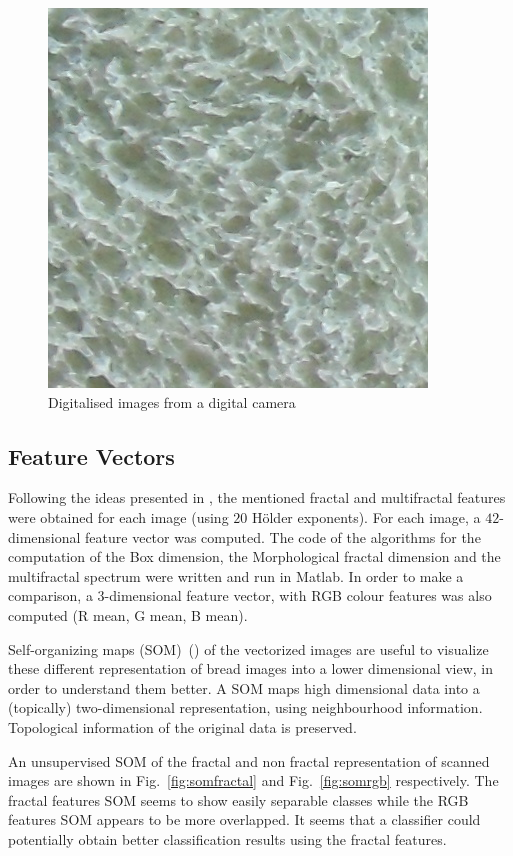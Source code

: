 \documentclass[oneside,a4paper,english,links]{amca}
\begin{document}
\begin{figure}[htb]
\includegraphics[scale=0.28]{imagenes/camera/Sa14}
\caption{Digitalised images from a digital camera}
\label{fig:camera}
\end{figure}

\subsection{Feature Vectors}


Following the ideas presented in \cite{Gonzales2008}, the mentioned fractal and multifractal features were obtained for each image (using $20$ H\"older exponents). For each image, a $42$-dimensional feature vector was computed. The code of the algorithms for the computation of the Box dimension, the Morphological fractal dimension and the multifractal spectrum were written and run in Matlab. In order to make a comparison, a $3$-dimensional feature vector, with RGB colour features was also computed (R mean, G mean, B mean).

Self-organizing maps (SOM)~(\cite{Kohonen2001}) of the vectorized images are useful to visualize these different representation of bread images into a lower dimensional view, in order to understand them better. A SOM maps high dimensional data into a (topically) two-dimensional representation, using neighbourhood information. Topological information of the original data is preserved.  

An unsupervised SOM of the fractal and non fractal representation of scanned images are shown in Fig.~\ref{fig:somfractal} and Fig.~\ref{fig:somrgb} respectively. The fractal features SOM seems to show easily separable classes while the RGB features SOM appears to be more overlapped. It seems that a classifier could potentially obtain better classification results using the fractal features. %
\end{document}
